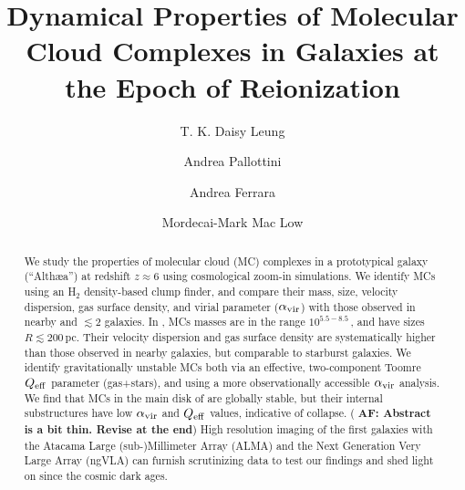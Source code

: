 \IfFileExists{emulateapjlegacy.cls}{\documentclass[iop]{emulateapjlegacy}}{\documentclass[iop]{emulateapj}}
\newcommand{\AF}[1]{({\bf \color{afcolor} AF: #1})}
\begin{document}
\title{Dynamical Properties of Molecular Cloud Complexes in Galaxies at the Epoch of Reionization}

\author{T. K. Daisy Leung}
\author{Andrea Pallottini}
\author{Andrea Ferrara}
\author{Mordecai-Mark Mac Low}


\begin{abstract}
We study the properties of molecular cloud (MC) complexes in a prototypical galaxy (``Alth{\ae}a'') at redshift $z\approx 6$ using cosmological zoom-in simulations.
%
We identify MCs using an H$_2$ density-based clump finder, and compare their mass, size, velocity dispersion, gas surface density, and virial parameter ($\alpha_{\rm vir}$) with those observed in nearby and \z$\lesssim 2$ galaxies.
%
In \flower, MCs masses are in the range $10^{5.5-8.5}$\,\Msun, and have sizes $R\lesssim200$\,pc. Their velocity dispersion and gas surface density are systematically higher than those observed in nearby galaxies, but comparable to starburst galaxies.
%
We identify gravitationally unstable MCs both via an effective, two-component Toomre $Q_{\rm eff}$ parameter (gas+stars), and using a more observationally accessible $\alpha_{\rm vir}$ analysis. We find that MCs in the main disk of \flower are globally stable, but their internal substructures have low $\alpha_{\rm vir}$ and $Q_{\rm eff}$ values, indicative of collapse.
%
\AF{Abstract is a bit thin. Revise at the end}
High resolution imaging of the first galaxies with the Atacama Large (sub-)Millimeter Array (ALMA) and the Next Generation Very Large Array (ngVLA) can furnish scrutinizing data to test our findings and shed light on \SF since the cosmic dark ages.
\end{abstract}
\end{document}
